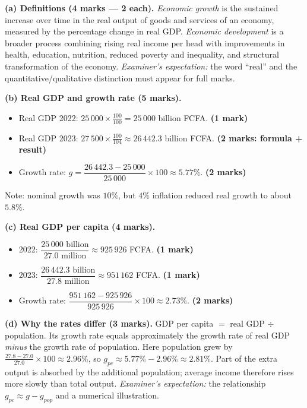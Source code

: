 \documentclass[11pt]{article}
\begin{document}
\begin{corrige}
\textbf{(a) Definitions (4 marks — 2 each).} \emph{Economic growth} is the sustained increase over time in the real output of goods and services of an economy, measured by the percentage change in real GDP. \emph{Economic development} is a broader process combining rising real income per head with improvements in health, education, nutrition, reduced poverty and inequality, and structural transformation of the economy. \emph{Examiner's expectation:} the word ``real'' and the quantitative/qualitative distinction must appear for full marks.

\textbf{(b) Real GDP and growth rate (5 marks).}
\begin{itemize}
\item Real GDP 2022: $25\,000 \times \frac{100}{100} = 25\,000$ billion FCFA. \textbf{(1 mark)}
\item Real GDP 2023: $27\,500 \times \frac{100}{104} \approx 26\,442.3$ billion FCFA. \textbf{(2 marks: formula + result)}
\item Growth rate: $g = \dfrac{26\,442.3 - 25\,000}{25\,000}\times 100 \approx 5.77\%$. \textbf{(2 marks)}
\end{itemize}
Note: nominal growth was $10\%$, but $4\%$ inflation reduced real growth to about $5.8\%$.

\textbf{(c) Real GDP per capita (4 marks).}
\begin{itemize}
\item 2022: $\dfrac{25\,000\text{ billion}}{27.0\text{ million}} \approx 925\,926$ FCFA. \textbf{(1 mark)}
\item 2023: $\dfrac{26\,442.3\text{ billion}}{27.8\text{ million}} \approx 951\,162$ FCFA. \textbf{(1 mark)}
\item Growth rate: $\dfrac{951\,162 - 925\,926}{925\,926}\times 100 \approx 2.73\%$. \textbf{(2 marks)}
\end{itemize}

\textbf{(d) Why the rates differ (3 marks).} GDP per capita $=$ real GDP $\div$ population. Its growth rate equals approximately the growth rate of real GDP \emph{minus} the growth rate of population. Here population grew by $\frac{27.8-27.0}{27.0}\times 100 \approx 2.96\%$, so $g_{pc} \approx 5.77\% - 2.96\% \approx 2.81\%$. Part of the extra output is absorbed by the additional population; average income therefore rises more slowly than total output. \emph{Examiner's expectation:} the relationship $g_{pc} \approx g - g_{pop}$ and a numerical illustration.


\end{corrige}
\end{document}
